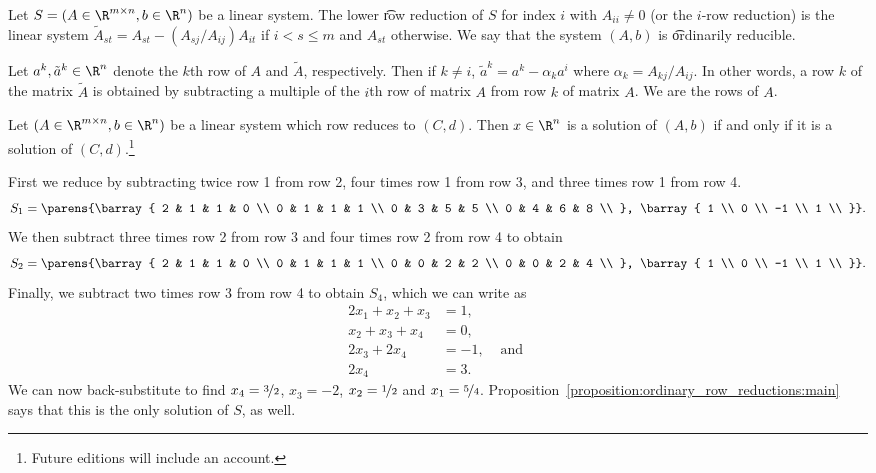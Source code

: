
Let $S = (A \in \R^{m \times n}, b \in \R^{n})$ be a linear system.
The lower \t{row reduction} of $S$ for index $i$ with $A_{ii} \neq 0$ (or the $i$-row reduction) is the linear system $\tilde{A}_{st} = A_{st} - (A_{sj}/A_{ij})A_{it}$ if $i < s \leq m$ and $A_{st}$ otherwise.
We say that the system $(A, b)$ is \t{ordinarily reducible}.


Let $a^k, \tilde{a}^k \in \R^{n}$ denote the $k$th row of $A$ and $\tilde{A}$, respectively.
Then if $k \neq i$, $\tilde{a}^k = a^k - \alpha_k a^i$ where $\alpha_k = A_{kj}/A_{ij}$.
In other words, a row $k$ of the matrix $\tilde{A}$ is obtained by subtracting a multiple of the $i$th row of matrix $A$ from row $k$ of matrix $A$.
We are  the rows of $A$.

\begin{proposition}
  Let $(A \in \R^{m \times n}, b \in \R^{n})$ be a linear system which row reduces to $(C, d)$.
  Then $x \in \R^{n}$ is a solution of $(A, b)$ if and only if it is a solution of $(C, d)$.\footnote{Future editions will include an account.}
  \label{propostion:linear_system_reductions:solution_equivalence}
\end{proposition}

First we reduce by subtracting twice row 1 from row 2, four times row 1 from row 3, and three times row 1 from row 4.
\[
	S_1 = \parens{\barray{
	2 & 1 & 1 & 0 \\
	0 & 1 & 1 & 1 \\
	0 & 3 & 5 & 5 \\
	0 & 4 & 6 & 8 \\
	}, \barray{
		1 \\
		0 \\
		-1 \\
		1 \\
	}}.
\]
We then subtract three times row 2 from row 3 and four times row 2 from row 4 to obtain
\[
	S_2 = \parens{\barray{
	2 & 1 & 1 & 0 \\
	0 & 1 & 1 & 1 \\
	0 & 0 & 2 & 2 \\
	0 & 0 & 2 & 4 \\
	}, \barray{
		1 \\
		0 \\
		-1 \\
		1 \\
	}}.
\]
Finally, we subtract two times row 3 from row 4 to obtain $S_4$, which we can write as
\[
	\begin{aligned}
	 2x_1 + x_2 + x_3         &= 1,& \\
	        x_2 + x_3 + x_4  &= 0,& \\
	               2x_3 + 2x_4  &= -1,& \text{ and } \\
	                      2x_4  &= 3.&
	\end{aligned}
\]
We can now back-substitute to find $x_4 = \nicefrac{3}{2}$, $x_3 = -2$, $x_2 = \nicefrac{1}{2}$ and $x_1 = \nicefrac{5}{4}$.
Proposition~\ref{proposition:ordinary_row_reductions:main} says that this is the only solution of $S$, as well.
